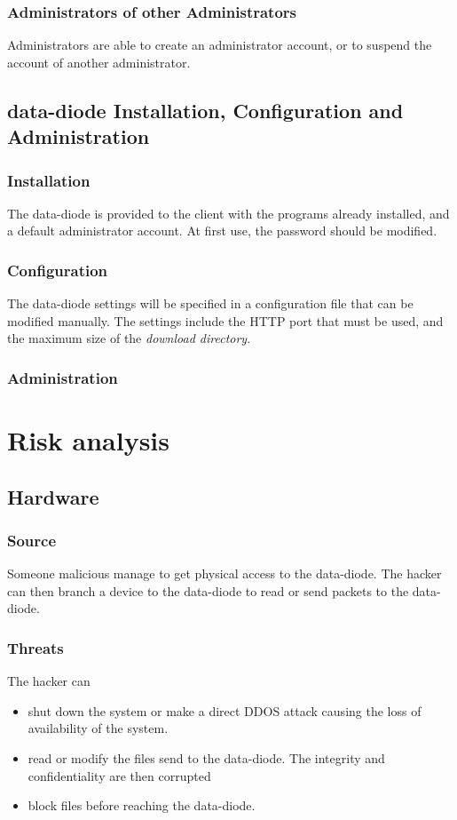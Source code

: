 \documentclass[a4paper,11pt]{article}
\begin{document}
\subsubsection{Administrators of other Administrators}
Administrators are able to create an administrator account, or to suspend the account of another administrator.

\subsection{data-diode Installation, Configuration and Administration}

\subsubsection{Installation}
The data-diode is provided to the client with the programs already installed, and a default administrator account. At first use, the password should be modified.

\subsubsection{Configuration}
The data-diode settings will be specified in a configuration file that can be modified manually. The settings include the HTTP port that must be used, and the maximum size of the \textit{download directory}.

\subsubsection{Administration}
\section{Risk analysis}
\subsection{Hardware}
\subsubsection{Source}
Someone malicious manage to get physical access to the data-diode. The hacker can then branch a device to the data-diode to read or send packets to the data-diode.
\subsubsection{Threats}
The hacker can
\begin{itemize}
\item shut down the system or make a direct DDOS attack causing the loss of availability of the system.
\item read or modify the files send to the data-diode. The integrity and confidentiality are then corrupted
\item block files before reaching the data-diode.
\end{itemize}
\end{document}
